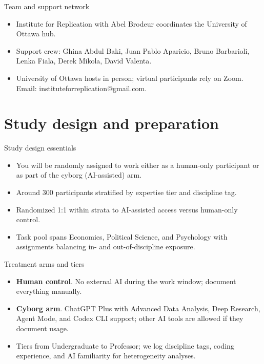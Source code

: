 \documentclass[aspectratio=169,professionalfonts]{beamer}
\begin{document}
\begin{frame}{Team and support network}
  \begin{itemize}
    \item Institute for Replication with Abel Brodeur coordinates the University of Ottawa hub.
    \item Support crew: Ghina Abdul Baki, Juan Pablo Aparicio, Bruno Barbarioli, Lenka Fiala, Derek Mikola, David Valenta.
    \item University of Ottawa hosts in person; virtual participants rely on Zoom. Email: instituteforreplication@gmail.com.
  \end{itemize}
\end{frame}

\section{Study design and preparation}

\begin{frame}{Study design essentials}
  \begin{itemize}
    \item You will be randomly assigned to work either as a human-only participant or as part of the cyborg (AI-assisted) arm.
    \item Around 300 participants stratified by expertise tier and discipline tag.
    \item Randomized 1:1 within strata to AI-assisted access versus human-only control.
    \item Task pool spans Economics, Political Science, and Psychology with assignments balancing in- and out-of-discipline exposure.
  \end{itemize}
\end{frame}

\begin{frame}{Treatment arms and tiers}
  \begin{itemize}
    \item \textbf{Human control}. No external AI during the work window; document everything manually.
    \item \textbf{Cyborg arm}. ChatGPT Plus with Advanced Data Analysis, Deep Research, Agent Mode, and Codex CLI support; other AI tools are allowed if they document usage.
    \item Tiers from Undergraduate to Professor; we log discipline tags, coding experience, and AI familiarity for heterogeneity analyses.
  \end{itemize}
\end{frame}
\end{document}
